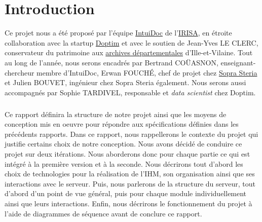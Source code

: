 \chapter{Introduction}
\setcounter{page}{1}
\pagestyle{fancy}
\fancyhf{}
\cfoot[\thepage]{\thepage}

Ce projet nous a été proposé par l’équipe \href{https://www-intuidoc.irisa.fr/}{IntuiDoc} de l’\href{https://www.irisa.fr/}{IRISA}, en étroite collaboration avec la startup \href{http://www.doptim.eu}{Doptim} et avec le soutien de Jean-Yves LE CLERC, conservateur du patrimoine aux \href{http://archives.ille-et-vilaine.fr/fr}{archives départementales} d'Ille-et-Vilaine. Tout au long de l’année, nous serons encadrés par Bertrand COÜASNON, enseignant-chercheur membre d'IntuiDoc, Erwan FOUCHÉ, chef de projet chez \href{https://www.soprasteria.com/fr}{Sopra Steria} et Julien BOUVET, ingénieur chez Sopra Steria également. Nous serons aussi accompagnés par Sophie TARDIVEL, responsable et \textit{data scientist} chez Doptim.

\paragraph{}
Ce rapport définira la structure de notre projet ainsi que les moyens de conception mis en oeuvre pour répondre aux spécifications définies dans les précédents rapports.
Dans ce rapport, nous rappellerons le contexte du projet qui justifie certains choix de notre conception. Nous avons décidé de conduire ce projet sur deux itérations. Nous aborderons donc pour chaque partie ce qui est intégré à la première version et à la seconde. Nous décrirons tout d'abord les choix de technologies pour la réalisation de l'IHM, son organisation ainsi que ses interactions avec le serveur. Puis, nous parlerons de la structure du serveur, tout d'abord d'un point de vue général, puis pour chaque module individuellement ainsi que leurs interactions. Enfin, nous décrirons le fonctionnement du projet à l'aide de diagrammes de séquence avant de conclure ce rapport.